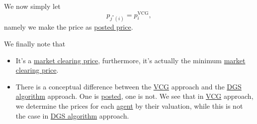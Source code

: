 We now simply let
\[
	p_{j^{\ast} (i)} = p_{i}^\mathrm{VCG},
\]
namely we make the price as \hyperref[rmk:posted]{posted price}.

\begin{remark}
	We finally note that
	\begin{itemize}
		\item It's a \hyperref[note:market-clearing-prices]{market clearing price}, furthermore, it's actually the minimum \hyperref[note:market-clearing-prices]{market clearing price}.
		\item There is a conceptual difference between the \hyperref[thm:VCG]{VCG} approach and the \hyperref[algo:Demange-Gale-Sotomayor-algorithm]{DGS algorithm} approach. One is \hyperref[rmk:posted]{posted}, one is not. We see that in \hyperref[thm:VCG]{VCG} approach, we determine the prices for each \hyperref[def:player]{agent} by their valuation, while this is not the case in \hyperref[algo:Demange-Gale-Sotomayor-algorithm]{DGS algorithm} approach.
	\end{itemize}
\end{remark}